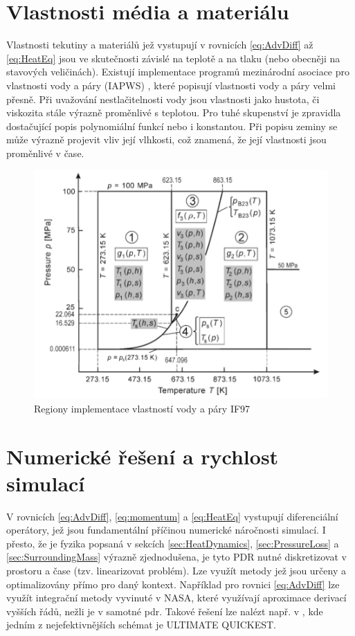 \section{Vlastnosti média a materiálu}
Vlastnosti tekutiny a materiálů jež vystupují v rovnicích \ref{eq:AdvDiff} až
\ref{eq:HeatEq} jsou ve skutečnosti závislé na teplotě a na tlaku (nebo
obecněji na stavových veličinách). Existují implementace programů mezinárodní
asociace pro vlastnosti vody a páry (IAPWS) \cite{IAPWS2007}, které popisují
vlastnosti vody a páry velmi přesně. Při uvažování nestlačitelnosti vody jsou
vlastnosti jako hustota, či viskozita stále výrazně proměnlivé s teplotou. Pro
tuhé skupenství je zpravidla dostačující popis polynomiální funkcí nebo i
konstantou. Při popisu zeminy se může výrazně projevit vliv její vlhkosti, což
znamená, že její vlastnosti jsou proměnlivé v čase.

\begin{figure}[h] \centering \capstart
  \includegraphics[scale=0.4]{figures/IF97}
  \caption{Regiony implementace vlastností vody a páry IF97 \cite{IAPWS2007}}
  \label{fig:IF97}
\end{figure}

\section{Numerické řešení a rychlost simulací}
\label{sec:NumSpeed}
V rovnicích \ref{eq:AdvDiff}, \ref{eq:momentum} a \ref{eq:HeatEq} vystupují
diferenciální operátory, jež jsou fundamentální příčinou numerické náročnosti
simulací. I přesto, že je fyzika popsaná v sekcích \ref{sec:HeatDynamics},
\ref{sec:PressureLoss} a \ref{sec:SurroundingMass} výrazně zjednodušena, je
tyto PDR nutné diskretizovat v prostoru a čase (tzv. linearizovat problém). Lze
využít metody jež jsou určeny a optimalizovány přímo pro daný kontext.
Například pro rovnici \ref{eq:AdvDiff} lze využít integrační metody vyvinuté v
NASA, které využívají aproximace derivací vyšších řádů, nežli je v samotné 
\acrshort{pdr}. Takové řešení lze nalézt např. v \cite{leonard1988}, kde jedním
z nejefektivnějších schémat je ULTIMATE QUICKEST.

